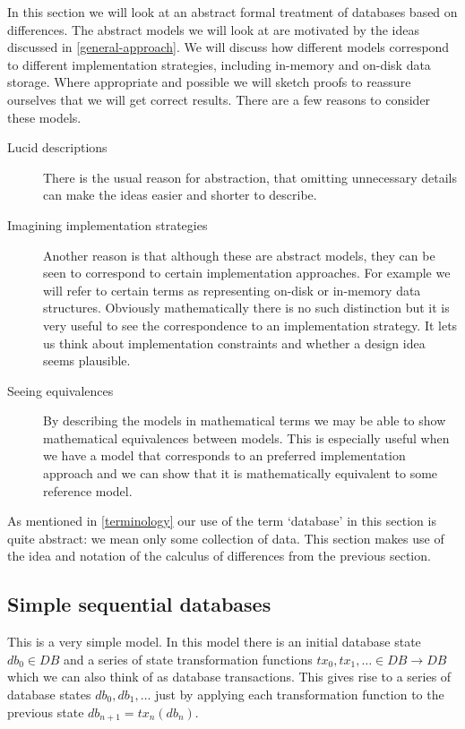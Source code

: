 \documentclass[11pt,a4paper]{article}
\begin{document}
In this section we will look at an abstract formal treatment of databases based
on differences. The abstract models we will look at are motivated by the ideas
discussed in \cref{general-approach}. We will discuss how different models
correspond to different implementation strategies, including in-memory and
on-disk data storage. Where appropriate and possible we will sketch proofs to
reassure ourselves that we will get correct results. There are a few reasons to
consider these models.
\begin{description}
\item[Lucid descriptions]
There is the usual reason for abstraction, that omitting unnecessary details can
make the ideas easier and shorter to describe.

\item[Imagining implementation strategies]
Another reason is that although these are abstract models, they can be seen
to correspond to certain implementation approaches. For example we will refer
to certain terms as representing on-disk or in-memory data structures. Obviously
mathematically there is no such distinction but it is very useful to see the
correspondence to an implementation strategy. It lets us think about
implementation constraints and whether a design idea seems plausible.

\item[Seeing equivalences]
By describing the models in mathematical terms we may be able to show
mathematical equivalences between models. This is especially useful when we
have a model that corresponds to an preferred implementation approach and we
can show that it is mathematically equivalent to some reference model.
\end{description}
As mentioned in \cref{terminology} our use of the term `database' in this
section is quite abstract: we mean only some collection of data. This section
makes use of the idea and notation of the calculus of differences from the
previous section.

\subsection{Simple sequential databases}
\label{simple-sequential-databases}

This is a very simple model. In this model there is an initial database state
$\mathit{db}_0 \in \mathit{DB}$ and a series of state transformation functions
$\mathit{tx}_0, \mathit{tx}_1, \ldots \in \mathit{DB} \to \mathit{DB} $ which we can also think of as database
transactions. This gives rise to a series of database states
$\mathit{db}_0, \mathit{db}_1, \ldots$ just by applying each transformation
function to the previous state
$\mathit{db}_{n+1} = \mathit{tx}_n(\mathit{db}_n)$.
\end{document}
